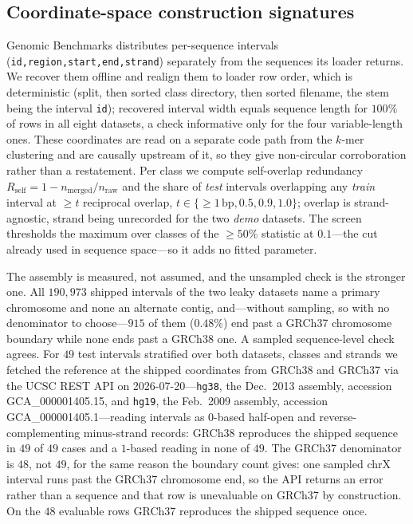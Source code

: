 \documentclass[webpdf,modern,large,namedate]{oup-authoring-template}%
\begin{document}
\subsection{Coordinate-space construction signatures}\label{sec:m-coord}
Genomic Benchmarks distributes per-sequence intervals (\texttt{id,region,start,end,strand}) separately from the sequences its loader returns. We recover them offline and realign them to loader row order, which is deterministic (split, then sorted class directory, then sorted filename, the stem being the interval \texttt{id}); recovered interval width equals sequence length for $100\%$ of rows in all eight datasets, a check informative only for the four variable-length ones. These coordinates are read on a separate code path from the $k$-mer clustering and are causally upstream of it, so they give non-circular corroboration rather than a restatement. Per class we compute self-overlap redundancy $R_{\mathrm{self}}=1-n_{\mathrm{merged}}/n_{\mathrm{raw}}$ and the share of \emph{test} intervals overlapping any \emph{train} interval at $\ge t$ reciprocal overlap, $t\in\{{\ge}1\,\mathrm{bp},0.5,0.9,1.0\}$; overlap is strand-agnostic, strand being unrecorded for the two \textit{demo} datasets. The screen thresholds the maximum over classes of the $\ge50\%$ statistic at $0.1$---the cut already used in sequence space---so it adds no fitted parameter.

The assembly is measured, not assumed, and the unsampled check is the stronger one. All $190{,}973$ shipped intervals of the two leaky datasets name a primary chromosome and none an alternate contig, and---without sampling, so with no denominator to choose---$915$ of them ($0.48\%$) end past a GRCh37 chromosome boundary while none ends past a GRCh38 one. A sampled sequence-level check agrees. For $49$ test intervals stratified over both datasets, classes and strands we fetched the reference at the shipped coordinates from GRCh38 and GRCh37 via the UCSC REST API on 2026-07-20---\texttt{hg38}, the Dec.\ 2013 assembly, accession GCA\_000001405.15, and \texttt{hg19}, the Feb.\ 2009 assembly, accession GCA\_000001405.1---reading intervals as $0$-based half-open and reverse-complementing minus-strand records: GRCh38 reproduces the shipped sequence in $49$ of $49$ cases and a $1$-based reading in none of $49$. The GRCh37 denominator is $48$, not $49$, for the same reason the boundary count gives: one sampled chrX interval runs past the GRCh37 chromosome end, so the API returns an error rather than a sequence and that row is unevaluable on GRCh37 by construction. On the $48$ evaluable rows GRCh37 reproduces the shipped sequence once.
\end{document}
